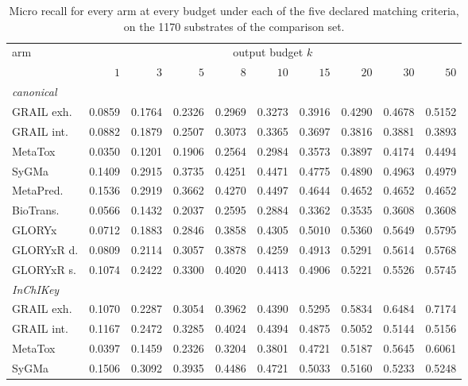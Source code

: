 \begin{table}[t]
\centering\scriptsize
\begin{threeparttable}
\caption{Micro recall for every arm at every budget under each of the five declared matching criteria, on the 1170 substrates of the comparison set.}
\label{tab:si-criterion-levels}
\setlength{\tabcolsep}{4pt}
\renewcommand{\arraystretch}{0.82}
\begin{tabular}{lrrrrrrrrr}
\toprule
arm & \multicolumn{9}{c}{output budget $k$} \\
\cmidrule(lr){2-10}
 & $1$ & $3$ & $5$ & $8$ & $10$ & $15$ & $20$ & $30$ & $50$ \\
\midrule
\multicolumn{10}{l}{\emph{canonical}} \\
\quad GRAIL exh. & 0.0859 & 0.1764 & 0.2326 & 0.2969 & 0.3273 & 0.3916 & 0.4290 & 0.4678 & 0.5152 \\
\quad GRAIL int. & 0.0882 & 0.1879 & 0.2507 & 0.3073 & 0.3365 & 0.3697 & 0.3816 & 0.3881 & 0.3893 \\
\quad MetaTox & 0.0350 & 0.1201 & 0.1906 & 0.2564 & 0.2984 & 0.3573 & 0.3897 & 0.4174 & 0.4494 \\
\quad SyGMa & 0.1409 & 0.2915 & 0.3735 & 0.4251 & 0.4471 & 0.4775 & 0.4890 & 0.4963 & 0.4979 \\
\quad MetaPred. & 0.1536 & 0.2919 & 0.3662 & 0.4270 & 0.4497 & 0.4644 & 0.4652 & 0.4652 & 0.4652 \\
\quad BioTrans. & 0.0566 & 0.1432 & 0.2037 & 0.2595 & 0.2884 & 0.3362 & 0.3535 & 0.3608 & 0.3608 \\
\quad GLORYx & 0.0712 & 0.1883 & 0.2846 & 0.3858 & 0.4305 & 0.5010 & 0.5360 & 0.5649 & 0.5795 \\
\quad GLORYxR d. & 0.0809 & 0.2114 & 0.3057 & 0.3878 & 0.4259 & 0.4913 & 0.5291 & 0.5614 & 0.5768 \\
\quad GLORYxR s. & 0.1074 & 0.2422 & 0.3300 & 0.4020 & 0.4413 & 0.4906 & 0.5221 & 0.5526 & 0.5745 \\
\midrule
\multicolumn{10}{l}{\emph{InChIKey}} \\
\quad GRAIL exh. & 0.1070 & 0.2287 & 0.3054 & 0.3962 & 0.4390 & 0.5295 & 0.5834 & 0.6484 & 0.7174 \\
\quad GRAIL int. & 0.1167 & 0.2472 & 0.3285 & 0.4024 & 0.4394 & 0.4875 & 0.5052 & 0.5144 & 0.5156 \\
\quad MetaTox & 0.0397 & 0.1459 & 0.2326 & 0.3204 & 0.3801 & 0.4721 & 0.5187 & 0.5645 & 0.6061 \\
\quad SyGMa & 0.1506 & 0.3092 & 0.3935 & 0.4486 & 0.4721 & 0.5033 & 0.5160 & 0.5233 & 0.5248 \\

\end{tabular}
\end{threeparttable}
\end{table}
